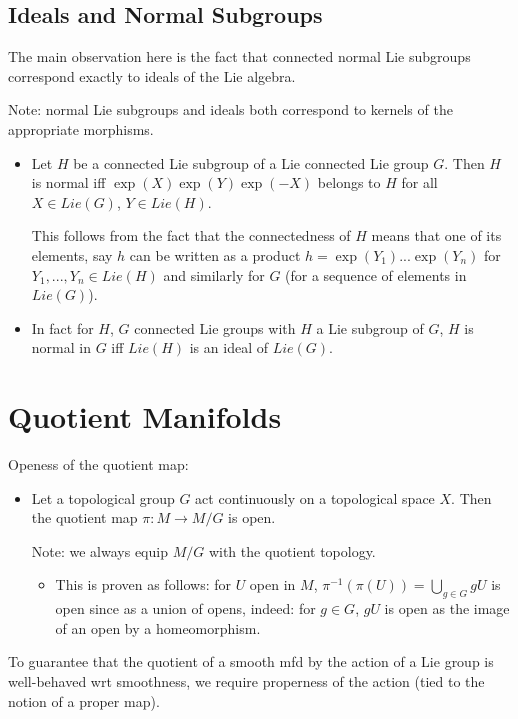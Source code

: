 \documentclass{report}
\theoremstyle{definition}
\begin{document}
\subsection{Ideals and Normal Subgroups}

The main observation here is the fact that connected normal Lie subgroups correspond exactly to ideals of the Lie algebra.

Note: normal Lie subgroups and ideals both correspond to kernels of the appropriate morphisms.

\begin{itemize}
    \item Let $H$ be a connected Lie subgroup of a Lie connected Lie group $G$. Then $H$ is normal iff $\exp(X)\exp(Y)\exp(-X)$ belongs to $H$ for all $X\in Lie(G)$, $Y\in Lie(H)$.

    This follows from the fact that the connectedness of $H$ means that one of its elements, say $h$ can be written as a product $h=\exp(Y_1)...\exp(Y_n)$ for $Y_1,...,Y_n\in Lie(H)$ and similarly for $G$ (for a sequence of elements in $Lie(G)$).
    \item In fact for $H$, $G$ connected Lie groups with $H$ a Lie subgroup of $G$, $H$ is normal in $G$ iff $Lie(H)$ is an ideal of $Lie(G)$.
\end{itemize}

\section{Quotient Manifolds}

Openess of the quotient map:
\begin{itemize}
    \item Let a topological group $G$ act continuously on a topological space $X$. Then the quotient map $\pi:M\to M/G$ is open.

    Note: we always equip $M/G$ with the quotient topology.
    \begin{itemize}
        \item This is proven as follows: for $U$ open in $M$, $\pi^{-1}(\pi(U))=\bigcup_{g\in G}gU$ is open since as a union of opens, indeed: for $g\in G$, $gU$ is open as the image of an open by a homeomorphism.
    \end{itemize}
\end{itemize}

To guarantee that the quotient of a smooth mfd by the action of a Lie group is well-behaved wrt smoothness, we require properness of the action (tied to the notion of a proper map).
\end{document}
